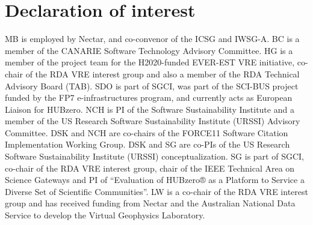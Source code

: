 \documentclass[review]{elsarticle}
\begin{document}
\section*{Declaration of interest}
MB is employed by Nectar, and co-convenor of the ICSG and IWSG-A.
BC is a member of the CANARIE Software Technology Advisory Committee.
HG is a member of the project team for the H2020-funded EVER-EST VRE initiative, co-chair of the RDA VRE interest group and also a member of the RDA Technical Advisory Board (TAB).
SDO is part of SGCI, was part of the SCI-BUS project funded by the FP7 e-infrastructures program, and currently acts as European Liaison for HUBzero.
NCH is PI of the Software Sustainability Institute and a member of the US Research Software Sustainability Institute (URSSI) Advisory Committee.
DSK and NCH are co-chairs of the FORCE11 Software Citation Implementation Working Group.
DSK and SG are co-PIs of the US Research Software Sustainability Institute (URSSI) conceptualization.
SG is part of SGCI, co-chair of the RDA VRE interest group, chair of the IEEE Technical Area on Science Gateways and PI of “Evaluation of HUBzero® as a Platform to Service a Diverse Set of Scientific Communities”.
LW is a co-chair of the RDA VRE interest group and has received funding from Nectar and the Australian National Data Service to develop the Virtual Geophysics Laboratory.

\clearpage
\end{document}
